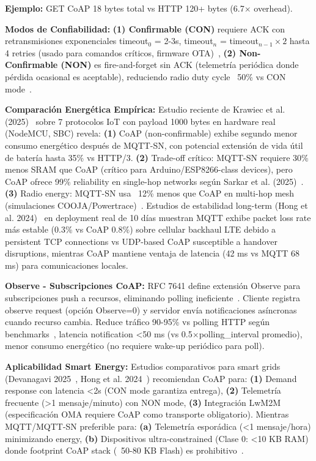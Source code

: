\textbf{Ejemplo:} GET CoAP 18 bytes total vs HTTP 120+ bytes (6.7$\times$ overhead).

\textbf{Modos de Confiabilidad:} \textbf{(1) Confirmable (CON)} requiere ACK con retransmisiones exponenciales timeout$_0$ = 2-3s, timeout$_n$ = timeout$_{n-1} \times 2$ hasta 4 retries (usado para comandos críticos, firmware OTA)~\cite{shelby6LoWPANWirelessEmbedded2009}, \textbf{(2) Non-Confirmable (NON)} es fire-and-forget sin ACK (telemetría periódica donde pérdida ocasional es aceptable), reduciendo radio duty cycle ~50\% vs CON mode~\cite{krawiecEnergyFootprintReliability2025}.

\textbf{Comparación Energética Empírica:} Estudio reciente de Krawiec et al. (2025)~\cite{krawiecEnergyFootprintReliability2025} sobre 7 protocolos IoT con payload 1000 bytes en hardware real (NodeMCU, SBC) revela: \textbf{(1)} CoAP (non-confirmable) exhibe segundo menor consumo energético después de MQTT-SN, con potencial extensión de vida útil de batería hasta 35\% vs HTTP/3. \textbf{(2)} Trade-off crítico: MQTT-SN requiere 30\% menos SRAM que CoAP (crítico para Arduino/ESP8266-class devices), pero CoAP ofrece 99\% reliability en single-hop networks según Sarkar et al. (2025)~\cite{sarkarDevelopmentCoAPProtocol2025}. \textbf{(3)} Radio energy: MQTT-SN usa ~12\% menos que CoAP en multi-hop mesh (simulaciones COOJA/Powertrace)~\cite{krawiecEnergyFootprintReliability2025}. Estudios de estabilidad long-term (Hong et al. 2024)~\cite{hongImplementationSmartFarm2024} en deployment real de 10 días muestran MQTT exhibe packet loss rate más estable (0.3\% vs CoAP 0.8\%) sobre cellular backhaul LTE debido a persistent TCP connections vs UDP-based CoAP susceptible a handover disruptions, mientras CoAP mantiene ventaja de latencia (42 ms vs MQTT 68 ms) para comunicaciones locales.

\textbf{Observe - Subscripciones CoAP:} RFC 7641 define extensión Observe para subscripciones push a recursos, eliminando polling ineficiente~\cite{shelby6LoWPANWirelessEmbedded2009}. Cliente registra observe request (opción Observe=0) y servidor envía notificaciones asíncronas cuando recurso cambia. Reduce tráfico 90-95\% vs polling HTTP según benchmarks~\cite{amezvaValdDesignImplementation2024}, latencia notification <50 ms (vs 0.5$\times$polling\_interval promedio), menor consumo energético (no requiere wake-up periódico para poll).

\textbf{Aplicabilidad Smart Energy:} Estudios comparativos para smart grids (Devanagavi 2025~\cite{devanagaviPerformanceEvaluationIoT2025}, Hong et al. 2024~\cite{hongImplementationSmartFarm2024}) recomiendan CoAP para: \textbf{(1)} Demand response con latencia <2s (CON mode garantiza entrega), \textbf{(2)} Telemetría frecuente (>1 mensaje/minuto) con NON mode, \textbf{(3)} Integración LwM2M (especificación OMA requiere CoAP como transporte obligatorio). Mientras MQTT/MQTT-SN preferible para: \textbf{(a)} Telemetría esporádica (<1 mensaje/hora) minimizando energy, \textbf{(b)} Dispositivos ultra-constrained (Clase 0: <10 KB RAM) donde footprint CoAP stack (~50-80 KB Flash) es prohibitivo~\cite{alkwiefiM2MProtocolsOverview2024}.

